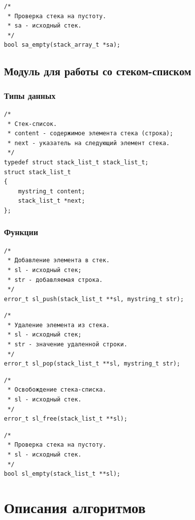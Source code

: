 \documentclass[a4paper,12pt]{extarticle}
\begin{document}
\begin{verbatim}
/*
 * Проверка стека на пустоту.
 * sa - исходный стек.
 */
bool sa_empty(stack_array_t *sa);
\end{verbatim}

\subsection{Модуль для работы со стеком-списком}
\subsubsection{Типы данных}

\begin{verbatim}
/*
 * Стек-список.
 * content - содержимое элемента стека (строка);
 * next - указатель на следующий элемент стека.
 */
typedef struct stack_list_t stack_list_t;
struct stack_list_t
{
    mystring_t content;
    stack_list_t *next;
};
\end{verbatim}

\subsubsection{Функции}

\begin{verbatim}
/*
 * Добавление элемента в стек.
 * sl - исходный стек;
 * str - добавляемая строка.
 */
error_t sl_push(stack_list_t **sl, mystring_t str);
\end{verbatim}

\begin{verbatim}
/*
 * Удаление элемента из стека.
 * sl - исходный стек;
 * str - значение удаленной строки.
 */
error_t sl_pop(stack_list_t **sl, mystring_t str);
\end{verbatim}

\begin{verbatim}
/*
 * Освобождение стека-списка.
 * sl - исходный стек.
 */
error_t sl_free(stack_list_t **sl);
\end{verbatim}

\begin{verbatim}
/*
 * Проверка стека на пустоту.
 * sl - исходный стек.
 */
bool sl_empty(stack_list_t **sl);
\end{verbatim}



\newpage
\section{Описания алгоритмов}
\end{document}
